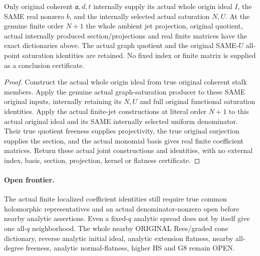 \begin{theorem}
\label{hir:relative-normal-finite-jet-original-saturation-consumer}
\leanok
{}
Only original coherent $\mathfrak a,d,t$ internally supply its actual whole
origin ideal $I$, the SAME real nonzero $b$, and the internally selected
actual saturation $N,U$. At the genuine finite order $N+1$ the whole
ambient jet projection, original quotient, actual internally produced
section/projections and real finite matrices have the exact dictionaries
above. The actual graph quotient and the original SAME-$U$ all-point
saturation identities are retained. No fixed index or finite matrix is
supplied as a conclusion certificate.
\end{theorem}
\begin{proof}
Construct the actual whole origin ideal from true original coherent stalk
members. Apply the genuine actual graph-saturation producer to these SAME
original inputs, internally retaining its $N,U$ and full original functional
saturation identities. Apply the actual finite-jet constructions at literal
order $N+1$ to this actual original ideal and its SAME internally selected
uniform denominator. Their true quotient freeness supplies projectivity,
the true original surjection supplies the section, and the actual monomial
basis gives real finite coefficient matrices. Return these actual joint
constructions and identities, with no external index, basis, section,
projection, kernel or flatness certificate.
\end{proof}

\paragraph{Open frontier.}
The actual finite localized coefficient identities still require true common
holomorphic representatives and an actual denominator-nonzero open before
nearby analytic assertions. Even a fixed-$q$ analytic spread does not by
itself give one all-$q$ neighborhood. The whole nearby ORIGINAL Rees/graded
cone dictionary, reverse analytic initial ideal, analytic extension flatness,
nearby all-degree freeness, analytic normal-flatness, higher HS and G8 remain OPEN.
